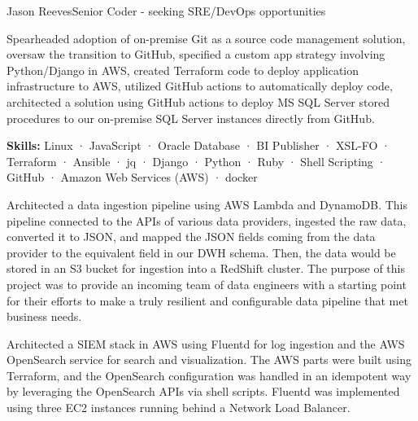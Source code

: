 \documentclass{article}
\begin{document}
\begin{cv}[avatar]{Jason Reeves}{Senior Coder - seeking SRE/DevOps opportunities}
\begin{cvevent}[August 2021][December 2023]
    \vspace*{5mm}
\end{cvevent}

\begin{cvevent}[Mar 2018][Aug 2021]
  Spearheaded adoption of on-premise Git as a source code management solution, oversaw the transition to GitHub, specified a custom app strategy involving Python/Django in AWS, created Terraform code to deploy application infrastructure to AWS, utilized GitHub actions to automatically deploy code, architected a solution using GitHub actions to deploy MS SQL Server stored procedures to our on-premise SQL Server instances directly from GitHub.
  
  \vspace*{3mm}
  \textbf{Skills:}  Linux · JavaScript · Oracle Database · BI Publisher · XSL-FO · Terraform · Ansible · jq · Django · Python · Ruby · Shell Scripting · GitHub · Amazon Web Services (AWS) · docker
\end{cvevent}


\onecolumn
{}  %

\begin{cvevent}[2023-2024]
    Architected a data ingestion pipeline using AWS Lambda and DynamoDB.  This pipeline connected to the APIs of various data providers, ingested the raw data, converted it to JSON, and mapped the JSON fields coming from the data provider to the equivalent field in our DWH schema.  Then, the data would be stored in an S3 bucket for ingestion into a RedShift cluster.  The purpose of this project was to provide an incoming team of data engineers with a starting point for their efforts to make a truly resilient and configurable data pipeline that met business needs.
    \vspace*{5mm}
\end{cvevent}

\begin{cvevent}[2022-2023]
    Architected a SIEM stack in AWS using Fluentd for log ingestion and the AWS OpenSearch service for search and visualization.  The AWS parts were built using Terraform, and the OpenSearch configuration was handled in an idempotent way by leveraging the OpenSearch APIs via shell scripts.  Fluentd was implemented using three EC2 instances running behind a Network Load Balancer.  
    \vspace*{5mm}
\end{cvevent}


\end{cv}
\end{document}

